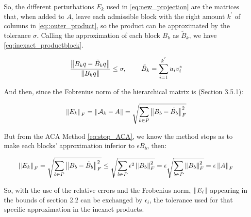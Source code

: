 So, the different perturbations $E_{k}$ used in \ref{eq:new_projection} are the matrices that, when added to $A$, leave each admissible block with the right amount $k^{'}$ of columns in \ref{eq::outer_product}, so the product can be approximated by the tolerance $\sigma$. Calling the approximation of each block $B_{k}$ as $\tilde{B}_{k}$, we have \ref{eq:inexact_productblock}.

\begin{equation}\label{eq:inexact_productblock}
    \frac{\left\lVert B_{k}q - \tilde{B}_{k}q \right\rVert}{\left\lVert B_{k}q\right\rVert} \leq \sigma, \hspace{0.3in} \tilde{B}_{k} = \sum_{i=1} ^{k^{'}} u_{i} v_{i} ^{*}
\end{equation}


And then, since the Fobrenius norm of the hierarchical matrix is \cite{hackbusch2015hierarchical}(Section 3.5.1):

\begin{equation}
    \left\lVert E_{k}\right\rVert_{F}= \left\lVert\mathcal{A}_{k} - A\right\rVert = \sqrt{\sum_{b \in P} \left\lVert B_{b} - \tilde{B}_{b}\right\rVert_{F}^{2} }
\end{equation}

But from the ACA Method \ref{eq:stop_ACA}, we know the method stops as to make each blocks' approximation inferior to $\epsilon B_{b}$, then:

\begin{equation}
    \left\lVert E_{k}\right\rVert_{F} = \sqrt{\sum_{b \in P} \left\lVert B_{b} - \tilde{B}_{b}\right\rVert_{F}^{2} } \leq \sqrt{\sum_{b\in P}\epsilon^{2}\left\lVert B_{b}\right\rVert_{F}^{2}} = \epsilon \sqrt{\sum_{b \in P}\left\lVert B_{b}\right\rVert_{F}^{2}}
    = \epsilon \left\lVert A\right\rVert_{F}
\end{equation}

So, with the use of the relative errors and the Frobenius norm, $\left\lVert E_{i}\right\rVert$ appearing in the bounds of section 2.2 can be exchanged by $\epsilon_{i}$, the tolerance used for that specific approximation in the inexact products.